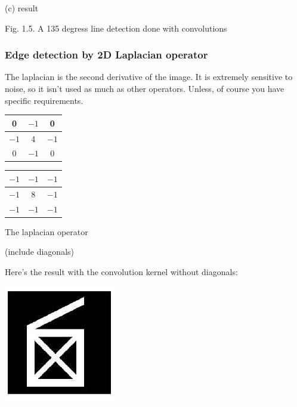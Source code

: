 \documentclass[10pt]{article}
\begin{document}
(c) result

Fig. 1.5. A 135 degress line detection done with convolutions

\subsubsection{Edge detection by 2D Laplacian operator}
The laplacian is the second derivative of the image. It is extremely sensitive to noise, so it isn't used as much as other operators. Unless, of course you have specific requirements.

\begin{tabular}{|c|c|c|}
\hline
0 & $-1$ & 0 \\
\hline
$-1$ & 4 & $-1$ \\
\hline
0 & $-1$ & 0 \\
\hline
\end{tabular}

\begin{tabular}{|c|c|c|}
\hline
$-1$ & $-1$ & $-1$ \\
\hline
$-1$ & 8 & $-1$ \\
\hline
$-1$ & $-1$ & $-1$ \\
\hline
\end{tabular}

The laplacian operator

(include diagonals)

Here's the result with the convolution kernel without diagonals:

\includegraphics[max width=\textwidth]{2022_01_06_b5ce182ed1bd5f482e5bg-12}
\end{document}
